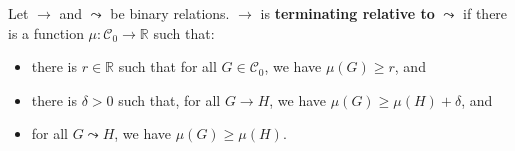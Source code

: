 \begin{proposition}
    \label{abstract_termination_criterion}
    Let \(\to\) and \(\leadsto\) be binary relations. \(\to\) is \textbf{terminating relative to} \(\leadsto\) if there is a function \(\mu : \mathcal{C}_0 \to \mathbb{R}\) such that:
\begin{itemize}
    \item there is $r \in \mathbb{R}$ such that for all \(G \in \mathcal{C}_0\),
    we have \(\mu(G) \geq r\), and
    \item there is $\delta > 0$ such that, for all \(G \to H\), we have \(\mu(G) \geq \mu(H) + \delta\), and
    \item for all \(G \leadsto H\), we have \(\mu(G) \geq \mu(H)\).
\end{itemize}
\end{proposition}